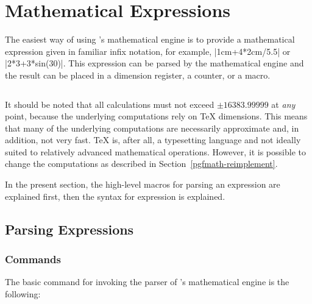 %
%
%


\section[math-parsing]{Mathematical Expressions}
\label{pgfmath-syntax}

The easiest way of using \pgfname's mathematical engine is to provide a
mathematical expression given in familiar infix notation, for example,
|1cm+4*2cm/5.5| or |2*3+3*sin(30)|. This expression can be parsed by the
mathematical engine and the result can be placed in a dimension register, a
counter, or a macro.
\begin{warpMathJax}
    \( \newcommand{\mvar}[1]{#1} \)
\end{warpMathJax}

It should be noted that all calculations must not exceed $\pm16383.99999$ at
\emph{any} point, because the underlying computations rely on \TeX{}
dimensions. This means that many of the underlying computations are necessarily
approximate and, in addition, not very fast. \TeX{} is, after all, a
typesetting language and not ideally suited to relatively advanced mathematical
operations. However, it is possible to change the computations as described in
Section~\ref{pgfmath-reimplement}.

In the present section, the high-level macros for parsing an expression are
explained first, then the syntax for expression is explained.


\subsection{Parsing Expressions}
\label{pgfmath-registers}
\label{pgfmath-parsing}

\subsubsection{Commands}

The basic command for invoking the parser of \pgfname's
mathematical engine is the following:

